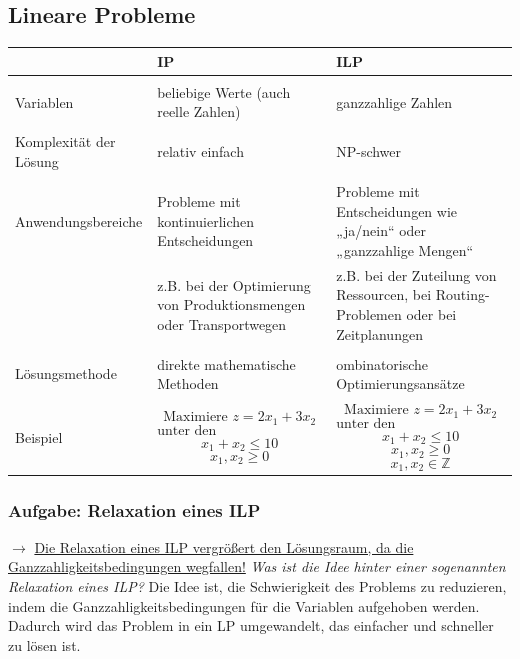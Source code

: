 \documentclass{article}
\begin{document}
\subsection{Lineare Probleme}
\begin{vsbox}[title=Unterschied zwischen LP und ILP ]
\begin{table}[H]
    \centering
    \begin{tabular}{p{3.1cm}| p{6cm} p{6cm}}
         & IP &  ILP   \\ \hline \\
        Variablen & beliebige Werte (auch reelle Zahlen) & ganzzahlige Zahlen \\  \\
        Komplexität der Lösung & relativ einfach & NP-schwer \\ \\
        Anwendungsbereiche & Probleme mit kontinuierlichen Entscheidungen & Probleme mit Entscheidungen wie „ja/nein“ oder „ganzzahlige Mengen“ \\
        & z.B. bei der Optimierung von Produktionsmengen oder Transportwegen & z.B. bei der Zuteilung von Ressourcen, bei Routing-Problemen oder bei Zeitplanungen \\ \\ 
        Lösungsmethode & direkte mathematische Methoden & ombinatorische Optimierungsansätze \\ \\
        Beispiel & 
        \[
        \text{Maximiere } z = 2x_1 + 3x_2
        \]
        \[
        \text{unter den Nebenbedingungen: }
        \]
        \[
        x_1 + x_2 \leq 10
        \]
        \[
        x_1, x_2 \geq 0
        \] & 
        \[
        \text{Maximiere } z = 2x_1 + 3x_2
        \]
        \[
        \text{unter den Nebenbedingungen: }
        \]
        \[
        x_1 + x_2 \leq 10
        \]
        \[
        x_1, x_2 \geq 0
        \]
        \[
        x_1, x_2 \in \mathbb{Z}
        \]
        \\
    \end{tabular}
    \label{tab:ipvsilp}
\end{table}
\end{vsbox}

\newpage
\subsubsection{Aufgabe: Relaxation eines ILP \textcolor{ForestGreen}{\CheckmarkBold}}
\noindent $\rightarrow$
\large \underline{Die Relaxation eines ILP vergrößert den Lösungsraum, da die Ganzzahligkeitsbedingungen wegfallen!} \normalsize \newline \newline
\textit{Was ist die Idee hinter einer sogenannten Relaxation  eines ILP? } \cite{probeklausur21} \cite{probeklausur24} \newline \newline
Die Idee ist, die Schwierigkeit des Problems zu reduzieren, indem die Ganzzahligkeitsbedingungen für die Variablen aufgehoben werden. Dadurch wird das Problem in ein LP umgewandelt, das einfacher und schneller zu lösen ist.
\end{document}
